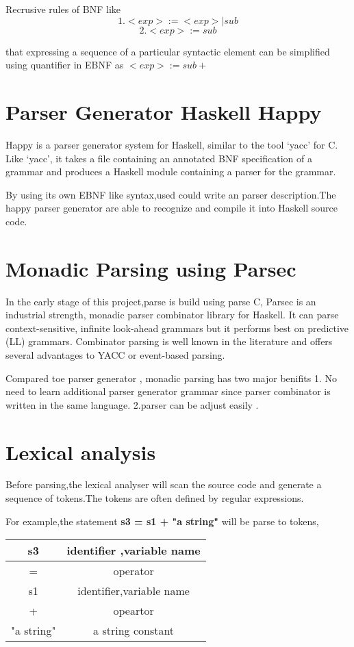 Recrusive rules of BNF  like 
\[   1. <exp> := <exp> | sub \]
\[	 2. <exp> := sub     \]
 
that expressing a sequence of a particular syntactic element can be simplified using quantifier in EBNF as $ <exp>:=sub+ $



\section{Parser Generator Haskell Happy}
Happy is a parser generator system for Haskell, similar to the tool `yacc' for C. Like `yacc', it takes a file containing an annotated BNF specification of a grammar and produces a Haskell module containing a parser for the grammar.
\cite{happy}

By using its own EBNF like syntax,used could write an parser description.The happy parser generator are able to recognize and compile it into Haskell source code.


\section{Monadic Parsing using Parsec}
In the early stage of this project,parse is build using parse C,
Parsec is an industrial strength, monadic parser combinator library for Haskell. It can parse context-sensitive, infinite look-ahead grammars but it performs best on
predictive (LL\cite{aho1986compilers}) grammars. Combinator parsing is well known in the literature
and offers several advantages to YACC or event-based parsing. \cite{leijen2001parsec}

Compared toe parser generator , monadic parsing has two major benifits
1. No need to learn additional parser generator grammar since parser combinator is written in the same language. 2.parser can be adjust easily .


\section{Lexical analysis}
Before parsing,the lexical analyser will scan the source code and generate a sequence of tokens.The tokens are often defined by regular expressions.

For example,the statement \textbf{s3 = s1 + "a string"} will be parse to tokens,

\begin{tabular}{|c|c|}
\hline s3 & identifier ,variable name \\ 
\hline = & operator \\ 
\hline s1 & identifier,variable name \\ 
\hline + & opeartor \\ 
\hline "a string" & a string constant \\ 
\hline 
\end{tabular} 

